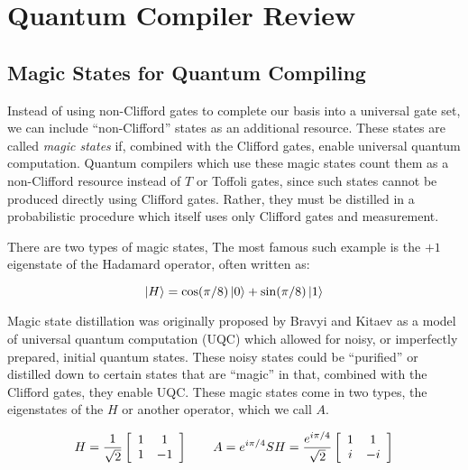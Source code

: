 \section{Quantum Compiler Review}
\label{sec:qcompile-review}

\subsection{Magic States for Quantum Compiling}

Instead of using non-Clifford gates to complete our basis into a universal
gate set, we can include ``non-Clifford'' states as an additional resource.
These states are called \emph{magic states} if, combined with the Clifford
gates, enable universal quantum computation.
Quantum compilers which use these magic states count them as a non-Clifford
resource instead of $T$ or Toffoli gates, since such states cannot
be produced directly using Clifford gates. Rather, they must be
distilled in a probabilistic procedure which itself uses only 
Clifford gates and measurement.

There are two types of magic states, 
The most famous such example is the $+1$ eigenstate of the Hadamard operator,
often written as:

\begin{equation}
\left\vert{H}\right\rangle = \cos(\pi/8)\left\vert{0}\right\rangle + \sin(\pi/8)\left\vert{1}\right\rangle
\end{equation}

Magic state distillation was originally proposed by Bravyi and Kitaev
\cite{Bravyi2005} as a model of universal quantum computation (UQC) which
allowed for noisy, or imperfectly prepared, initial quantum states. These
noisy states could be ``purified'' or distilled down to certain states
that are ``magic'' in that, combined with the Clifford gates, they enable
UQC. These magic states come in two types, the eigenstates
of the $H$ or another operator, which we call $A$.

\begin{equation}
H = 
\frac{1}{\sqrt{2}}
\left[ \begin{array}{cc}
1 & 1\\
1 & -1
\end{array} \right]
\qquad
A = e^{i\pi / 4} SH = \frac{e^{i\pi/4}}{\sqrt{2}}
\left[ \begin{array}{cc}
1 & 1\\
i & -i
\end{array} \right]
\label{eqn:T}
\end{equation}

